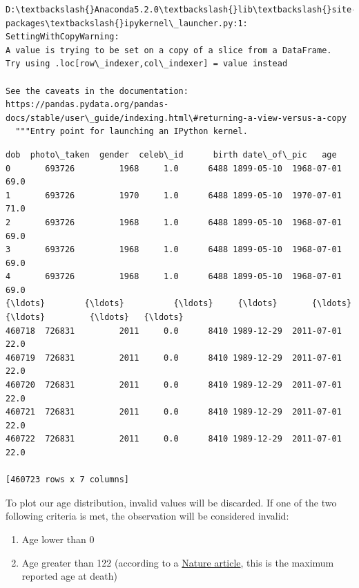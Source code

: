 \documentclass[11pt]{article}
\makeatletter
\providecommand{\tightlist}{%
      \setlength{\itemsep}{0pt}\setlength{\parskip}{0pt}}
\newcommand{\boxspacing}{\kern\kvtcb@left@rule\kern\kvtcb@boxsep}
\newcommand{\prompt}[4]{
        \ttfamily\llap{{\color{#2}[#3]:\hspace{3pt}#4}}\vspace{-\baselineskip}
    }
\makeatother
\begin{document}
    \begin{Verbatim}[commandchars=\\\{\}]
D:\textbackslash{}Anaconda5.2.0\textbackslash{}lib\textbackslash{}site-packages\textbackslash{}ipykernel\_launcher.py:1:
SettingWithCopyWarning:
A value is trying to be set on a copy of a slice from a DataFrame.
Try using .loc[row\_indexer,col\_indexer] = value instead

See the caveats in the documentation: https://pandas.pydata.org/pandas-
docs/stable/user\_guide/indexing.html\#returning-a-view-versus-a-copy
  """Entry point for launching an IPython kernel.
    \end{Verbatim}

            \begin{tcolorbox}[breakable, size=fbox, boxrule=.5pt, pad at break*=1mm, opacityfill=0]
\prompt{Out}{outcolor}{97}{\boxspacing}
\begin{Verbatim}[commandchars=\\\{\}]
           dob  photo\_taken  gender  celeb\_id      birth date\_of\_pic   age
0       693726         1968     1.0      6488 1899-05-10  1968-07-01  69.0
1       693726         1970     1.0      6488 1899-05-10  1970-07-01  71.0
2       693726         1968     1.0      6488 1899-05-10  1968-07-01  69.0
3       693726         1968     1.0      6488 1899-05-10  1968-07-01  69.0
4       693726         1968     1.0      6488 1899-05-10  1968-07-01  69.0
{\ldots}        {\ldots}          {\ldots}     {\ldots}       {\ldots}        {\ldots}         {\ldots}   {\ldots}
460718  726831         2011     0.0      8410 1989-12-29  2011-07-01  22.0
460719  726831         2011     0.0      8410 1989-12-29  2011-07-01  22.0
460720  726831         2011     0.0      8410 1989-12-29  2011-07-01  22.0
460721  726831         2011     0.0      8410 1989-12-29  2011-07-01  22.0
460722  726831         2011     0.0      8410 1989-12-29  2011-07-01  22.0

[460723 rows x 7 columns]
\end{Verbatim}
\end{tcolorbox}
        
    To plot our age distribution, invalid values will be discarded. If one
of the two following criteria is met, the observation will be considered
invalid:

\begin{enumerate}
\def\labelenumi{\arabic{enumi}.}
\tightlist
\item
  Age lower than 0
\item
  Age greater than 122 (according to a
  \href{https://www.nature.com/articles/nature19793\#:~:text=Maximum\%20lifespan\%20is\%2C\%20in\%20contrast,individual\%20who\%20ever\%20lived4.}{Nature
  article}, this is the maximum reported age at death)
\end{enumerate}
\end{document}
